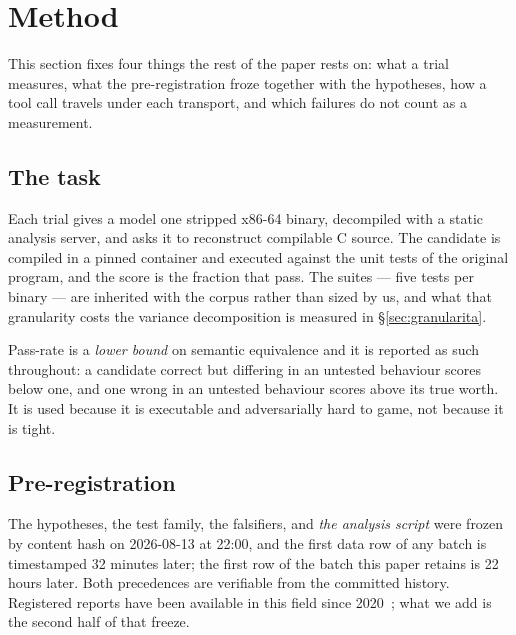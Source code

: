 \section{Method}
\label{sec:method}

This section fixes four things the rest of the paper rests on: what a trial measures, what the
pre-registration froze together with the hypotheses, how a tool call travels under each transport, and
which failures do not count as a measurement.

\subsection{The task}

Each trial gives a model one stripped x86-64 binary, decompiled with a static analysis server, and asks
it to reconstruct compilable C source. The candidate is compiled in a pinned container and executed
against the unit tests of the original program, and the score is the fraction that pass. The suites ---
five tests per binary --- are inherited with the corpus rather than sized by us, and what that granularity
costs the variance decomposition is measured in \S\ref{sec:granularita}.

Pass-rate is a \emph{lower bound} on semantic equivalence and it is reported as such throughout: a
candidate correct but differing in an untested behaviour scores below one, and one wrong in an untested
behaviour scores above its true worth. It is used because it is executable and adversarially hard to game,
not because it is tight.

\subsection{Pre-registration}

The hypotheses, the test family, the falsifiers, and \emph{the analysis script} were frozen by content
hash on 2026-08-13 at 22:00, and the first data row of any batch is timestamped 32 minutes later; the
first row of the batch this paper retains is 22 hours later. Both precedences are verifiable from the
committed history. Registered reports have been available in this field since
2020~\citep{ernst2023registered}; what we add is the second half of that freeze.

